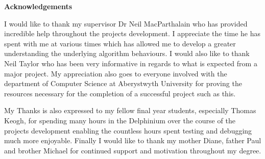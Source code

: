 \thispagestyle{empty}

\begin{center}
    {\LARGE\bf Acknowledgements}
\end{center}
I would like to thank my supervisor Dr Neil MacParthalain who has provided incredible help throughout the projects development. I appreciate the time he has spent with me at various times which has allowed me to develop a greater understanding the underlying algorithm behaviours. I would also like to thank Neil Taylor who has been very informative in regards to what is expected from a major project. My appreciation also goes to everyone involved with the department of Computer Science at Aberystwyth University for proving the resources necessary for the completion of a successful project such as this.

My Thanks is also expressed to my fellow final year students, especially Thomas Keogh, for spending many hours in the Delphinium over the course of the projects development enabling the countless hours spent testing and debugging much more enjoyable. Finally I would like to thank my mother Diane, father Paul and brother Michael for continued support and motivation throughout my degree.
